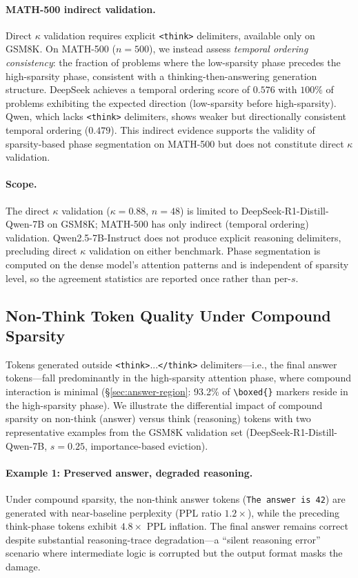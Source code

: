 \paragraph{MATH-500 indirect validation.}
Direct $\kappa$ validation requires explicit \texttt{<think>} delimiters, available only on GSM8K. On MATH-500 ($n{=}500$), we instead assess \emph{temporal ordering consistency}: the fraction of problems where the low-sparsity phase precedes the high-sparsity phase, consistent with a thinking-then-answering generation structure. DeepSeek achieves a temporal ordering score of $0.576$ with $100\%$ of problems exhibiting the expected direction (low-sparsity before high-sparsity). Qwen, which lacks \texttt{<think>} delimiters, shows weaker but directionally consistent temporal ordering ($0.479$). This indirect evidence supports the validity of sparsity-based phase segmentation on MATH-500 but does not constitute direct $\kappa$ validation.

\paragraph{Scope.}
The direct $\kappa$ validation ($\kappa{=}0.88$, $n{=}48$) is limited to DeepSeek-R1-Distill-Qwen-7B on GSM8K; MATH-500 has only indirect (temporal ordering) validation. Qwen2.5-7B-Instruct does not produce explicit reasoning delimiters, precluding direct $\kappa$ validation on either benchmark. Phase segmentation is computed on the dense model's attention patterns and is independent of sparsity level, so the agreement statistics are reported once rather than per-$s$.


\subsection{Non-Think Token Quality Under Compound Sparsity}
\label{app:nt-samples}

Tokens generated outside \texttt{<think>}...\texttt{</think>} delimiters---i.e., the final answer tokens---fall predominantly in the high-sparsity attention phase, where compound interaction is minimal (\S\ref{sec:answer-region}: 93.2\% of \verb|\boxed{}| markers reside in the high-sparsity phase). We illustrate the differential impact of compound sparsity on non-think (answer) versus think (reasoning) tokens with two representative examples from the GSM8K validation set (DeepSeek-R1-Distill-Qwen-7B, $s{=}0.25$, importance-based eviction).

\paragraph{Example 1: Preserved answer, degraded reasoning.}
Under compound sparsity, the non-think answer tokens (\texttt{The answer is 42}) are generated with near-baseline perplexity (PPL ratio $1.2{\times}$), while the preceding think-phase tokens exhibit $4.8{\times}$ PPL inflation. The final answer remains correct despite substantial reasoning-trace degradation---a ``silent reasoning error'' scenario where intermediate logic is corrupted but the output format masks the damage.


